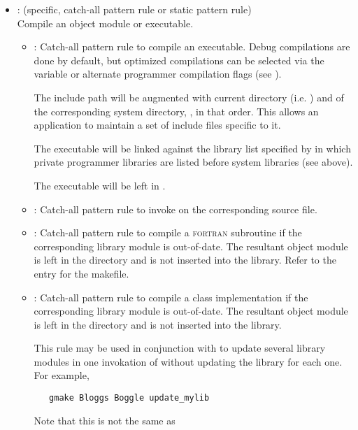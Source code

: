 \begin{itemize}
\item
   \code{\%} : (specific, catch-all pattern rule or static pattern rule)
   \\ Compile an object module or executable.
   \begin{itemize}
   \item
      : Catch-all pattern rule to compile an executable.  Debug
      compilations are done by default, but optimized compilations can be
      selected via the  variable or alternate programmer compilation
      flags (see ).

      The include path will be augmented with current directory (i.e.
      ) and of the corresponding system directory,
      , in that order.  This allows an application to
      maintain a set of include files specific to it.

      The executable will be linked against the library list specified by
       in which private programmer libraries are listed
      before system libraries (see above).

      The executable will be left in .
   \item
      :  Catch-all pattern rule to invoke  on
      the corresponding  source file.
   \item
      :  Catch-all pattern rule to compile a \textsc{fortran}
      subroutine if the corresponding library module is out-of-date.  The
      resultant object module is left in the  directory and
      is not inserted into the library.  Refer to the entry for the 
      makefile.
   \item
      :  Catch-all pattern rule to compile a class implementation if
      the corresponding library module is out-of-date.  The resultant object
      module is left in the  directory and is not inserted
      into the library.

      This rule may be used in conjunction with  to update
      several library modules in one invokation of  without
      updating the library for each one.  For example,

\begin{verbatim}
   gmake Bloggs Boggle update_mylib
\end{verbatim}

      \noindent
      Note that this is not the same as


\end{itemize}
\end{itemize}

